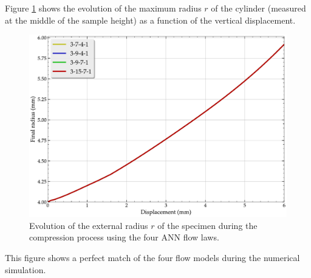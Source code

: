 \documentclass[algorithms,article,submit,pdftex,moreauthors]{Definitions/mdpi}
\begin{document}
Figure \ref{fig:radiusCurve} shows the evolution of the maximum radius $r$ of the cylinder (measured at the middle of the sample height) as a function of the vertical displacement.
\begin{figure}[!ht]
\centering
\includegraphics[width=0.75\columnwidth]{Figures/radiusCurve}
\caption{Evolution of the external radius $r$ of the specimen during the compression process using the four ANN flow laws.}
\label{fig:radiusCurve}
\end{figure}
This figure shows a perfect match of the four flow models during the numerical simulation.
\end{document}

